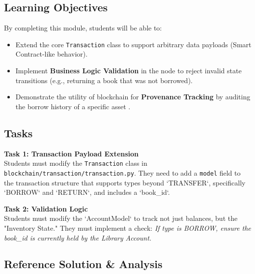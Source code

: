 \subsection{Learning Objectives}
By completing this module, students will be able to:
\begin{itemize}
    \item Extend the core \texttt{Transaction} class to support arbitrary data payloads (Smart Contract-like behavior).
    \item Implement \textbf{Business Logic Validation} in the node to reject invalid state transitions (e.g., returning a book that was not borrowed).
    \item Demonstrate the utility of blockchain for \textbf{Provenance Tracking} by auditing the borrow history of a specific asset \cite{swan2015blockchain}.
\end{itemize}

\subsection{Tasks}

\textbf{Task 1: Transaction Payload Extension} \\
Students must modify the \texttt{Transaction} class in \texttt{blockchain/transaction/transaction.py}. They need to add a \texttt{model} field to the transaction structure that supports types beyond `TRANSFER`, specifically `BORROW` and `RETURN`, and includes a `book\_id`.

\textbf{Task 2: Validation Logic} \\
Students must modify the `AccountModel` to track not just balances, but the "Inventory State." They must implement a check: \textit{If type is BORROW, ensure the book\_id is currently held by the Library Account.}

\subsection{Reference Solution \& Analysis}





